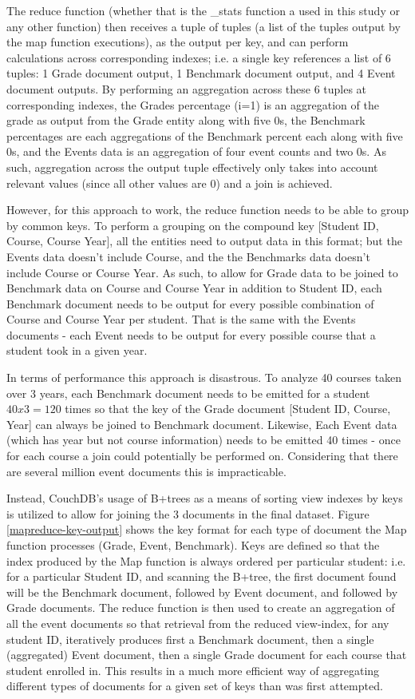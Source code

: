 The reduce function (whether that is the \_stats function a used in this study or any other function) then receives a tuple of tuples (a list of the tuples output by the map function executions), as the output per key, and can perform calculations across corresponding indexes; i.e. a single key references a list of 6 tuples: 1 Grade document output, 1 Benchmark document output, and 4 Event document outputs. By performing an aggregation across these 6 tuples at corresponding indexes, the Grades percentage (i=1) is an aggregation of the grade as output from the Grade entity along with five 0s, the Benchmark percentages are each aggregations of the Benchmark percent each along with five 0s, and the Events data is an aggregation of four event counts and two 0s. As such, aggregation across the output tuple effectively only takes into account relevant values (since all other values are 0) and a join is achieved.

However, for this approach to work, the reduce function needs to be able to group by common keys. To perform a grouping on the compound key [Student ID, Course, Course Year], all the entities need to output data in this format; but the Events data doesn't include Course, and the the Benchmarks data doesn't include Course or Course Year. As such, to allow for Grade data to be joined to Benchmark data on Course and Course Year in addition to Student ID, each Benchmark document needs to be output for every possible combination of Course and Course Year per student. That is the same with the Events documents - each Event needs to be output for every possible course that a student took in a given year.

In terms of performance this approach is disastrous. To analyze 40 courses taken over 3 years, each Benchmark document needs to be emitted for a student $40 x 3 = 120$ times so that the key of the Grade document [Student ID, Course, Year] can always be joined to Benchmark document. Likewise, Each Event data (which has year but not course information) needs to be emitted 40 times - once for each course a join could potentially be performed on. Considering that there are several million event documents this is impracticable.

Instead, CouchDB's usage of B+trees as a means of sorting view indexes by keys is utilized to allow for joining the 3 documents in the final dataset. Figure \ref{mapreduce-key-output} shows the key format for each type of document the Map function processes (Grade, Event, Benchmark). Keys are defined so that the index produced by the Map function is always ordered per particular student: i.e. for a particular Student ID, and scanning the B+tree, the first document found will be the Benchmark document, followed by Event document, and followed by Grade documents. The reduce function is then used to create an aggregation of all the event documents so that retrieval from the reduced view-index, for any student ID, iteratively produces first a Benchmark document, then a single (aggregated) Event document, then a single Grade document for each course that student enrolled in. This results in a much more efficient way of aggregating different types of documents for a given set of keys than was first attempted.

